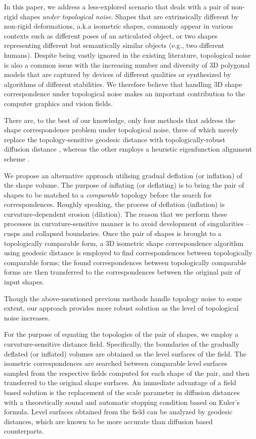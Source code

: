 \documentclass{egpubl}
\begin{document}
In this paper, we address a less-explored scenario that deals with a pair of non-rigid shapes \emph{under topological noise}. Shapes that are extrinsically different by non-rigid deformations, a.k.a isometric shapes, commonly appear in various contexts such as different poses of an articulated object, or two shapes representing different but semantically similar objects (e.g., two different humans). Despite being vastly ignored in the existing literature, topological noise is also a common issue with the increasing number and diversity of 3D polygonal models that are captured by devices of different qualities or synthesized by algorithms of different stabilities. We therefore believe that handling 3D shape correspondence under topological noise makes an important contribution to the computer graphics and vision fields.

There are, to the best of our knowledge, only four methods that address the shape correspondence problem under topological noise, three of which merely replace the topology-sensitive geodesic distance with topologically-robust diffusion distance \cite{Bronstein10, Sharma10, Sharma11}, whereas the other employs a heuristic eigenfunction alignment scheme \cite{Mateus08}.


We propose an alternative approach utilising gradual deflation (or inflation) of the shape volume. The purpose of inflating (or deflating) is to bring the pair of shapes to be matched to a \emph{comparable} topology before the search for correspondences. Roughly speaking, the process of deflation (inflation) is  curvature-dependent erosion (dilation).
The reason that we perform these processes in curvature-sensitive manner is to avoid development of singularities -- cusps and collapsed boundaries. Once the pair of shapes is brought to a topologically comparable form, a 3D isometric shape correspondence algorithm using geodesic distance is employed to find correspondences between topologically comparable forms; the found correspondences between topologically comparable forms are then transferred to the correspondences between the original pair of input shapes.


Though the above-mentioned previous methods handle topology noise to some extent, our approach provides more robust solution as the level of topological noise increases. 

For the purpose of equating the topologies of the pair of shapes, we employ a curvature-sensitive distance field. Specifically, the boundaries of the gradually deflated (or inflated) volumes  are obtained as the level surfaces of the field.
The isometric correspondences are searched between comparable level surfaces sampled from the respective fields computed for each shape of the pair, and then transferred to the original shape surfaces. An immediate advantage of a  field based solution is the replacement of the scale parameter in diffusion distances with a theoretically sound and automatic stopping condition based on Euler's formula. Level surfaces obtained from the field can be analyzed by geodesic distances, which are known to be more accurate than diffusion based counterparts.
\end{document}
